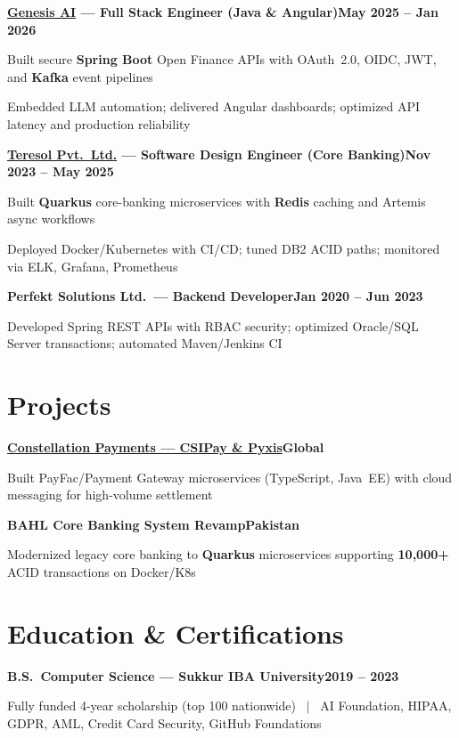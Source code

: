 \documentclass[letterpaper,10pt]{article}
\newcommand{\heading}[2]{
  \hspace{6pt}#1\hfill#2\\[-1pt]
}
\newcommand{\headingBf}[2]{
  \heading{\textbf{#1}}{\textbf{#2}}
}
\newenvironment{resume_list}{
  \vspace{-2pt}
  \begin{itemize}[itemsep=0pt, parsep=0pt, topsep=1pt, leftmargin=14pt]
}{
  \end{itemize}
  \vspace{1pt}
}
\begin{document}
\headingBf{\href{https://www.linkedin.com/company/genesisaico/}{Genesis AI} --- Full Stack Engineer (Java \& Angular)}{May 2025 -- Jan 2026}
\begin{resume_list}
  \item Built secure \textbf{Spring Boot} Open Finance APIs with OAuth~2.0, OIDC, JWT, and \textbf{Kafka} event pipelines
  \item Embedded LLM automation; delivered Angular dashboards; optimized API latency and production reliability
\end{resume_list}

\headingBf{\href{https://teresol.com/}{Teresol Pvt.\ Ltd.} --- Software Design Engineer (Core Banking)}{Nov 2023 -- May 2025}
\begin{resume_list}
  \item Built \textbf{Quarkus} core-banking microservices with \textbf{Redis} caching and Artemis async workflows
  \item Deployed Docker/Kubernetes with CI/CD; tuned DB2 ACID paths; monitored via ELK, Grafana, Prometheus
\end{resume_list}

\headingBf{Perfekt Solutions Ltd.\ --- Backend Developer}{Jan 2020 -- Jun 2023}
\begin{resume_list}
  \item Developed Spring REST APIs with RBAC security; optimized Oracle/SQL Server transactions; automated Maven/Jenkins CI
\end{resume_list}

\section{Projects}

\headingBf{\href{https://www.constellationpayments.com/}{Constellation Payments --- CSIPay \& Pyxis}}{Global}
\begin{resume_list}
  \item Built PayFac/Payment Gateway microservices (TypeScript, Java~EE) with cloud messaging for high-volume settlement
\end{resume_list}

\headingBf{BAHL Core Banking System Revamp}{Pakistan}
\begin{resume_list}
  \item Modernized legacy core banking to \textbf{Quarkus} microservices supporting \textbf{10,000+} ACID transactions on Docker/K8s
\end{resume_list}

\section{Education \& Certifications}
\headingBf{B.S.\ Computer Science --- Sukkur IBA University}{2019 -- 2023}
\begin{resume_list}
  \item Fully funded 4-year scholarship (top 100 nationwide) ~$|$~ AI Foundation, HIPAA, GDPR, AML, Credit Card Security, GitHub Foundations
\end{resume_list}
\end{document}

